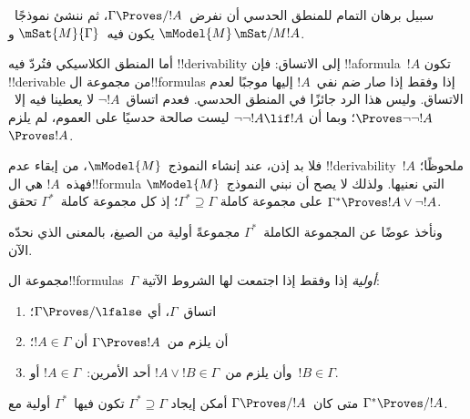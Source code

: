 \documentclass[../../../include/open-logic-section]{subfiles}
\begin{document}


سبيل برهان التمام للمنطق الحدسي أن نفرض~$\Gamma \Proves/ !A$، ثم ننشئ
نموذجًا~$\mModel{M}$ يكون فيه~$\mSat{M}{\Gamma}$ و$\mSat/{M}{!A}$.

أما المنطق الكلاسيكي فتُردّ فيه !!{derivability} إلى الاتساق: فإن
!!a{formula}~$!A$ تكون !!{derivable} من مجموعة
ال!!{formula}s إذا وفقط إذا صار ضم نفي~$!A$ إليها موجبًا لعدم الاتساق.
وليس هذا الرد جائزًا في المنطق الحدسي. فعدم اتساق~$\lnot !A$
لا يعطينا فيه إلا~$\Proves \lnot\lnot !A$؛ وبما أن
$\lnot\lnot !A \lif !A$ ليست صالحة حدسيًا على العموم، لم يلزم
$\Proves !A$.

فلا بد إذن، عند إنشاء النموذج~$\mModel{M}$، من إبقاء عدم
!!{derivability}~$!A$ ملحوظًا؛ فهذه~$!A$ هي ال!!{formula} التي نعنيها.
ولذلك لا يصح أن نبني النموذج~$\mModel{M}$ على مجموعة كاملة
$\Gamma^* \supseteq \Gamma$؛ إذ كل مجموعة كاملة~$\Gamma^*$ تحقق
$\Gamma^* \Proves !A \lor \lnot !A$.

ونأخذ عوضًا عن المجموعة الكاملة~$\Gamma^*$ مجموعةً أولية من الصيغ،
بالمعنى الذي نحدّه الآن.

\begin{defn}
  مجموعة ال!!{formula}s~$\Gamma$ \emph{أولية} إذا وفقط إذا اجتمعت لها
  الشروط الآتية:
  \begin{enumerate}
  \item{} اتساق~$\Gamma$، أي
    $\Gamma \Proves/ \lfalse$؛
  \item{} أن يلزم من~$\Gamma \Proves !A$ أن
    $!A \in \Gamma$؛
  \item{} وأن يلزم من~$!A \lor !B \in \Gamma$ أحد
    الأمرين:~$!A \in \Gamma$ أو~$!B \in \Gamma$.
  \end{enumerate}
\end{defn}

\begin{lem}[لمّة ليندنباوم]
   متى كان~$\Gamma \Proves/ !A$ أمكن إيجاد
  $\Gamma^* \supseteq \Gamma$ تكون فيها~$\Gamma^*$ أولية مع
  $\Gamma^* \Proves/ !A$.
\end{lem}
\end{document}
